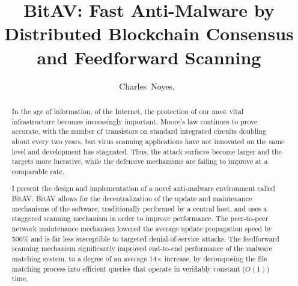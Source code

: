 \documentclass[12pt,journal]{IEEEtran}
\begin{document}
\title{BitAV: Fast Anti-Malware by Distributed Blockchain Consensus and Feedforward Scanning}
%
\author{Charles~Noyes,~%
}%

\maketitle







\begin{abstract}
In the age of information, of the Internet, the protection of our most vital infrastructure becomes increasingly important. Moore’s law continues to prove accurate, with the number of transistors on standard integrated circuits doubling about every two years, but virus scanning applications have not innovated on the same level and development has stagnated. Thus, the attack surfaces become larger and the targets more lucrative, while the defensive mechanisms are failing to improve at a comparable rate.\par
I present the design and implementation of a novel anti-malware environment called BitAV. BitAV allows for the decentralization of the update and maintenance mechanisms of the software, traditionally performed by a central host, and uses a staggered scanning mechanism in order to improve performance. The peer-to-peer network maintenance mechanism lowered the average update propagation speed by 500\% and is far less susceptible to targeted denial-of-service attacks. The feedforward scanning mechanism significantly improved end-to-end performance of the malware matching system, to a degree of an average 14$\times{}$ increase, by decomposing the file matching process into efficient queries that operate in verifiably constant ($O(1)$) time.
\end{abstract}



\IEEEpeerreviewmaketitle
\end{document}
